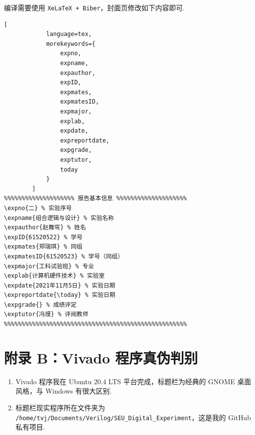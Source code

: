 \documentclass[11pt]{SEU-Digital-Report}
\begin{document}
        编译需要使用 \texttt{XeLaTeX + Biber}，封面页修改如下内容即可.
        \begin{lstlisting}[
            language=tex,
            morekeywords={
                expno,
                expname,
                expauthor,
                expID,
                expmates,
                expmatesID,
                expmajor,
                explab,
                expdate,
                expreportdate,
                expgrade,
                exptutor,
                today
            }
        ]
%%%%%%%%%%%%%%%%%%%% 报告基本信息 %%%%%%%%%%%%%%%%%%%%
\expno{二} % 实验序号
\expname{组合逻辑与设计} % 实验名称
\expauthor{赵舞穹} % 姓名
\expID{61520522} % 学号
\expmates{郑瑞琪} % 同组
\expmatesID{61520523} % 学号（同组）
\expmajor{工科试验班} % 专业
\explab{计算机硬件技术} % 实验室
\expdate{2021年11月5日} % 实验日期
\expreportdate{\today} % 实验日期
\expgrade{} % 成绩评定
\exptutor{冯熳} % 评阅教师
%%%%%%%%%%%%%%%%%%%%%%%%%%%%%%%%%%%%%%%%%%%%%%%%%%%%
        \end{lstlisting}

    \section*{附录 B：Vivado 程序真伪判别}

    \begin{enumerate}
        \item Vivado 程序我在 Ubuntu 20.4 LTS 平台完成，标题栏为经典的 GNOME 桌面风格，与 Windows 有很大区别.
        \item 标题栏现实程序所在文件夹为 \texttt{/home/tvj/Documents/Verilog/SEU\_Digital\_Experiment}，这是我的 GitHub 私有项目.
    \end{enumerate}
\end{document}
